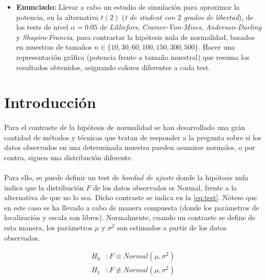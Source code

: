 \documentclass[a4paper, spanish]{article}
\begin{document}
  \maketitle
  \begin{itemize}
    \item \textbf{Enunciado:} Llevar a cabo un estudio de simulación para aproximar la potencia, en la alternativa $t(2)$ (\emph{t de student con $2$ grados de libertad}), de los tests de nivel $\alpha = 0.05$ de \emph{Lilliefors}, \emph{Cramer-Von-Mises}, \emph{Anderson-Darling} y \emph{Shapiro-Francia}, para contrastar la hipótesis nula de normalidad, basados en muestras de tamaños $n \in \{10, 30, 60, 100, 150, 300, 500\}$. Hacer una representación gráfica (potencia frente a tamaño muestral) que resuma los resultados obtenidos, asignando colores diferentes a cada test.
  \end{itemize}

  \section{Introducción}

    \paragraph{}
    Para el contraste de la hipótesis de normalidad se han desarrollado una grán cantidad de métodos y técnicas que tratan de responder a la pregunta sobre si los datos observados en una determinada muestra pueden asumirse normales, o por contra, siguen una distribución diferente.

    \paragraph{}
    Para ello, se puede definir un test de \emph{bondad de ajuste} donde la hipótesis nula indica que la distribución $F$ de los datos observados es Normal, frente a la alternativa de que no lo sea. Dicho contraste se indica en la \autoref{eq:test}. Nótese que en este caso se ha llevado a cabo de manera compuesta (donde los parámetros de localización y escala son libres). Normalmente, cuando un contraste se define de esta manera, los parámetros $\mu$ y $\sigma ^ 2$ son estimados a partir de los datos observados.

    \begin{equation*}
    \label{eq:test}
      \begin{split}
        H_0&: F \equiv Normal(\mu, \sigma^2) \\
        H_1&: F \not\equiv Normal(\mu, \sigma^2)
      \end{split}
    \end{equation*}
\end{document}
